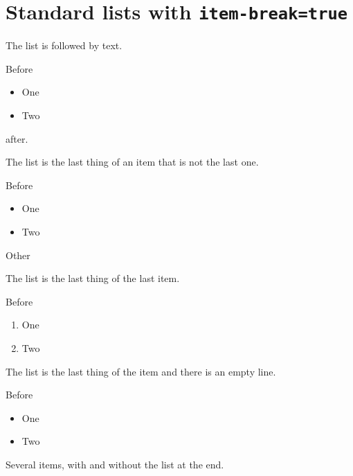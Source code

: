 \documentclass{article}
\begin{document}
\section{Standard lists with \texttt{item-break=true}}

The list is followed by text.

\begin{enumext*}[columns=1,item-break=true]
  \item Before \begin{itemize}\item One \item Two\end{itemize} after.
\end{enumext*}

The list is the last thing of an item that is not the last one.

\begin{enumext*}[columns=1,item-break=true]
  \item Before \begin{itemize}\item One \item Two\end{itemize}
  \item Other
\end{enumext*}

The list is the last thing of the last item.

\begin{enumext*}[columns=1,item-break=true]
  \item Before \begin{enumerate}\item One \item Two\end{enumerate}
\end{enumext*}

The list is the last thing of the item and there is an empty line.

\begin{enumext*}[columns=1,item-break=true]
  \item Before \begin{itemize}\item One \item Two\end{itemize}

\end{enumext*}

Several items, with and without the list at the end.
\end{document}
